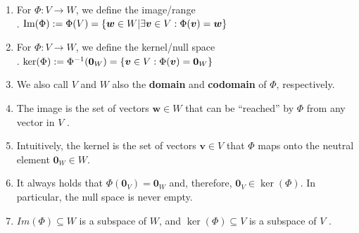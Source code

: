 \begin{enumerate}
    \item
    \begin{definition}
        For $\Phi  : V \to W$, we define the image/range
        \hfill \cite{mfml/book/mml/Deisenroth-Faisal-Ong}
        \\
        .\hfill
        $
            \text{Im}(\Phi )
            := \Phi (V )
            = \left\{\bm{w} \in W|\exists \bm{v} \in V : \Phi (\bm{v}) = \bm{w}\right\}
        $
        \hfill \cite{mfml/book/mml/Deisenroth-Faisal-Ong}
    \end{definition}

    \item
    \begin{definition}
        For $\Phi  : V \to W$, we define the kernel/null space
        \hfill \cite{mfml/book/mml/Deisenroth-Faisal-Ong}
        \\
        .\hfill
        $
            \ker(\Phi )
            := \Phi ^{-1} (\bm{0}_W )
            = \left\{\bm{v} \in V : \Phi (\bm{v}) = \bm{0}_W \right\}
        $
        \hfill \cite{mfml/book/mml/Deisenroth-Faisal-Ong}
    \end{definition}


    \item We also call $V$ and $W$ also the \textbf{domain} and \textbf{codomain} of $\Phi$, respectively.
    \hfill \cite{mfml/book/mml/Deisenroth-Faisal-Ong}

    \item The image is the set of vectors $\bm{w} \in W$ that can be “reached” by $\Phi$ from any vector in $V$ .
    \hfill \cite{mfml/book/mml/Deisenroth-Faisal-Ong}

    \item Intuitively, the kernel is the set of vectors $\bm{v} \in V$ that $\Phi$ maps onto the neutral element $\bm{0}_W \in W$.
    \hfill \cite{mfml/book/mml/Deisenroth-Faisal-Ong}

    \item It always holds that $\Phi(\bm{0}_V ) = \bm{0}_W$ and, therefore, $\bm{0}_V \in \ker(\Phi)$.
    In particular, the null space is never empty.
    \hfill \cite{mfml/book/mml/Deisenroth-Faisal-Ong}

    \item $Im(\Phi) \subseteq W$ is a subspace of $W$, and $\ker(\Phi) \subseteq V$ is a subspace of $V$ .
    \hfill \cite{mfml/book/mml/Deisenroth-Faisal-Ong}


\end{enumerate}
